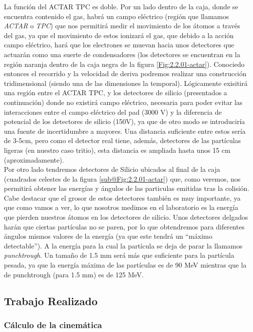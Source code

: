 \documentclass[12pt,a4paper]{article}
\numberwithin{equation}{section}
\numberwithin{figure}{section}
\begin{document}
La función del ACTAR TPC es doble. Por un lado dentro de la caja, donde se encuentra contenido el gas, habrá un campo eléctrico (región que llamamos {\it ACTAR} o {\it TPC}) que nos permitirá medir el movimiento de los átomos a través del gas, ya que  el movimiento de estos ionizará el gas, que debido a la acción campo eléctrico, hará que los electrones se muevan  hacia unos detectores que actuarán como una suerte de condensadores (los detectores se encuentran en la región naranja dentro de la caja negra de la figura \ref{Fig:2.2.01-actar}). Conociedo entonces el recorrido y la velocidad de deriva podremos realizar una construcción tridimensional (siendo una de las dimensiones la temporal). Lógicamente exisitirá una región entre el ACTAR TPC, y los detectores de silicio (presentados a continuación) donde no existirá campo eléctrico, necesaria para poder evitar las interacciones entre el campo eléctrico del pad (3000 V) y la diferencia de potencial de los detectores de silicio (150V), ya que de otro modo se introduciría una fuente de incertidumbre a mayores. Una distancia suficiente entre estos sería de 3-5cm, pero como el detector real tiene, además, detectores de las partículas ligeras (en nuestro caso tritio), esta distancia es ampliada hasta unos 15 cm (aproximadamente).  \\

Por otro lado tendremos detectores de Silicio ubicados al final de la caja (cuadrados celestes de la figura \ref{sub@Fig:2.2.01-actar}) que, como veremos, nos permitirá obtener las energías y ángulos de las particulas emitidas tras la colisión. Cabe destacar que el grosor de estos detectores también es muy importante, ya que como vamos a ver, lo que nosotros medimos en el laboratorio es la energía que pierden nuestros átomos en los detectores de silicio. Unos detectores delgados harán que ciertas partículas no se paren, por lo que obtendremos para diferentes ángulos mismos valores de la energía (ya que este tendrá un ``máximo detectable''). A la energía para la cual la partícula se deja de parar la llamamos {\it punchtrough}. Un tamaño de 1.5 mm será más que suficiente para la partícula pesada, ya que la energía máxima de las partículas es de 90 MeV mientras que la de punchtrough (para 1.5 mm) es de 125 MeV.  


\subsection{Trabajo Realizado}

\subsubsection{Cálculo de la cinemática}
\end{document}
